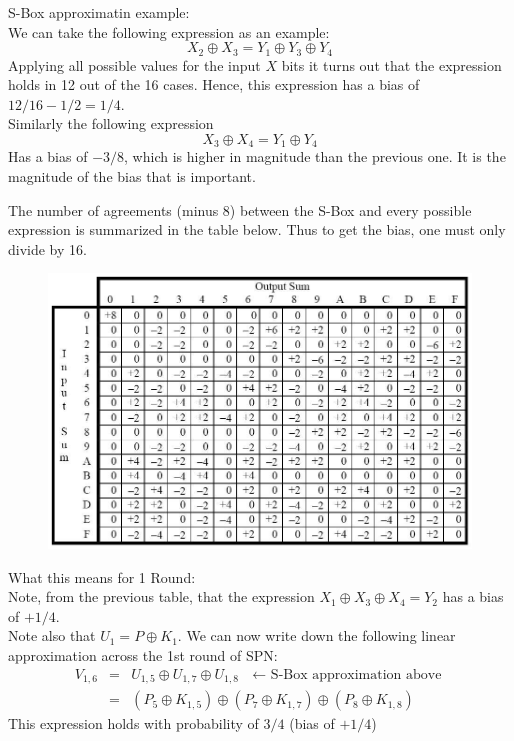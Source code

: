 \documentclass[9pt]{beamer}
\begin{document}
\begin{frame}
S-Box approximatin example:\\
\vspace{5mm}
We can take the following expression as an example:
\[ X_2 \oplus X_3 = Y_1 \oplus Y_3 \oplus Y_4 \]
Applying all possible values for the input $X$ bits it turns out that the expression holds in 12 out of the 16 cases. Hence, this expression has a bias of $12/16 - 1/2 = 1/4$.\\
\vspace{5mm}
Similarly the following expression
\[ X_3 \oplus X_4 = Y_1 \oplus Y_4 \]
Has a bias of $-3/8$, which is higher in magnitude than the previous one. It is the magnitude of the bias that is important.
\end{frame}

\begin{frame}
The number of agreements (minus 8) between the S-Box and every possible expression is summarized in the table below. Thus to get the bias, one must only divide by 16.\\
\vspace{5mm}
\begin{figure}
\includegraphics[height=0.7\textheight]{spn_linear_approx.jpg}
\end{figure}
\end{frame}


\begin{frame}
What this means for 1 Round:\\
\vspace{5mm}
Note, from the previous table, that the expression $X_1 \oplus X_3 \oplus X_4 = Y_2$ has a bias of $+1/4$. \\
\vspace{5mm}
Note also that $U_1 = P \oplus K_1$. 
\vspace{5mm} We can now write down the following linear approximation across the 1st round of SPN:
\begin{eqnarray*}
V_{1,6} & = & U_{1,5} \oplus U_{1,7} \oplus U_{1,8} \mbox{  $\leftarrow$ S-Box approximation above}\\
		  & = & (P_5\oplus K_{1,5}) \oplus (P_7\oplus K_{1,7}) \oplus (P_8\oplus K_{1,8})
\end{eqnarray*}
This expression holds with probability of $3/4$ (bias of $+1/4$)
\end{frame}
\end{document}
